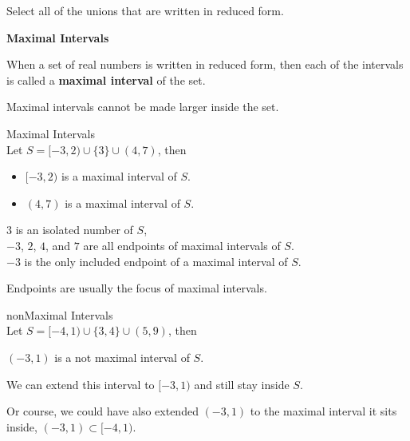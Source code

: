 \documentclass{ximera}
\begin{document}
\begin{question}
Select all of the unions that are written in reduced form.
  \begin{selectAll}
  \choice {$[-3, 4) \cup (2, 7)$}
  \choice {$(-3, 2] \cup [4, 7] \cup \{ 3 \}$}
  \choice [correct]{$[-3, 2) \cup \{ 3 \} \cup (4, 7)$}
  \choice {$(4, 7) \cup [-3, 2)$}
  \end{selectAll}
\end{question}




\begin{definition} \textbf{\textcolor{green!50!black}{Maximal Intervals}}

When a set of real numbers is written in reduced form, then each of the intervals is called a \textbf{maximal interval} of the set.
\end{definition}
Maximal intervals cannot be made larger inside the set.  


\begin{example} Maximal Intervals \\
Let $S = [-3, 2) \cup \{ 3 \} \cup (4, 7)$, then

\begin{itemize}
\item $[-3, 2)$ is a maximal interval of $S$.
\item $(4, 7)$ is a maximal interval of $S$.
\end{itemize}


$3$ is an isolated number of $S$, \\

$-3$, $2$, $4$, and $7$ are all endpoints of maximal intervals of $S$. \\

$-3$ is the only included endpoint of a maximal interval of $S$.



\end{example}
Endpoints are usually the focus of maximal intervals.







\begin{example} nonMaximal Intervals \\
Let $S = [-4, 1) \cup \{ 3, 4 \} \cup (5, 9)$, then


$(-3, 1)$ is a not maximal interval of $S$.

We can extend this interval to $[-3, 1)$ and still stay inside $S$.


\end{example}
Or course, we could have also extended $(-3, 1)$ to the maximal interval it sits inside, $(-3, 1) \subset [-4, 1)$. \\
\end{document}
